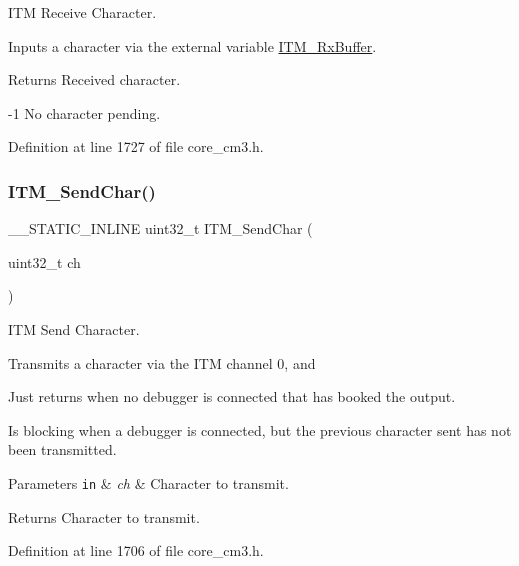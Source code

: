 I\+TM Receive Character. 

Inputs a character via the external variable \hyperlink{group___c_m_s_i_s__core___debug_functions_ga12e68e55a7badc271b948d6c7230b2a8}{I\+T\+M\+\_\+\+Rx\+Buffer}. \begin{DoxyReturn}{Returns}
Received character. 

-\/1 No character pending. 
\end{DoxyReturn}


Definition at line 1727 of file core\+\_\+cm3.\+h.

\mbox{\label{group___c_m_s_i_s__core___debug_functions_gac90a497bd64286b84552c2c553d3419e}} 
\subsubsection{\texorpdfstring{I\+T\+M\+\_\+\+Send\+Char()}{ITM\_SendChar()}}
{\footnotesize\ttfamily \+\_\+\+\_\+\+S\+T\+A\+T\+I\+C\+\_\+\+I\+N\+L\+I\+NE uint32\+\_\+t I\+T\+M\+\_\+\+Send\+Char (\begin{DoxyParamCaption}\item[{uint32\+\_\+t}]{ch }\end{DoxyParamCaption})}



I\+TM Send Character. 

Transmits a character via the I\+TM channel 0, and \begin{DoxyItemize}
\item Just returns when no debugger is connected that has booked the output. \item Is blocking when a debugger is connected, but the previous character sent has not been transmitted. 
\begin{DoxyParams}[1]{Parameters}
\mbox{\tt in}  & {\em ch} & Character to transmit. \\
\hline
\end{DoxyParams}
\begin{DoxyReturn}{Returns}
Character to transmit. 
\end{DoxyReturn}
\end{DoxyItemize}


Definition at line 1706 of file core\+\_\+cm3.\+h.



